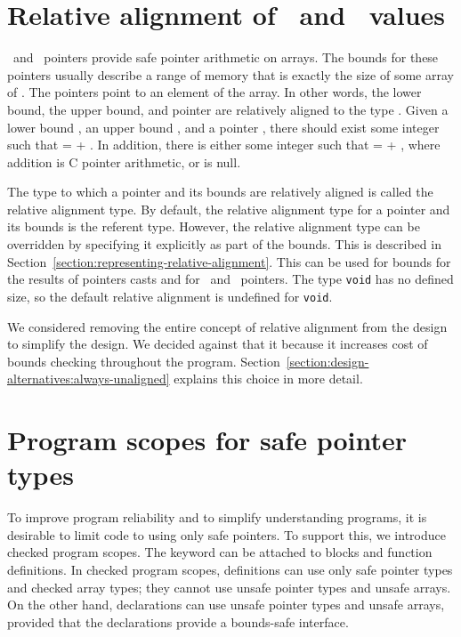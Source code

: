 \section{Relative alignment of \arrayptr\ and \arrayview\ values}
\label{section:relative-alignment}

\arrayptrT\ and \arrayviewT\ pointers provide safe
pointer arithmetic on arrays. The bounds for these pointers usually
describe a range of memory that is exactly the size of some array of .
The pointers point to an element of the array. In other words, the lower
bound, the upper bound, and pointer are  relatively aligned to the type
. Given a lower bound , an upper bound , and a
pointer , there should exist some integer  such that
 =  + . In addition, there is either some
integer  such that  =  + ,
where addition is C pointer arithmetic, or  is null.

The type to which a pointer and its bounds are relatively aligned is
called the relative alignment type. By default, the relative alignment
type for a pointer and its bounds is the referent type. However, the
relative alignment type can be overridden by specifying it explicitly as
part of the bounds.  This is described in 
Section~\ref{section:representing-relative-alignment}.
This can be used for bounds for the results of pointers casts and 
for  \arrayptrvoid\ and \arrayviewvoid\ pointers. The type
\texttt{void} has no defined size, so the default relative alignment is
undefined for \texttt{void}.

We considered removing the entire concept of relative alignment from the
design to simplify the design.  We decided against that it because it 
increases cost of bounds checking throughout the program.  
Section~\ref{section:design-alternatives:always-unaligned} explains
this choice in more detail.

\section{Program scopes for safe pointer types}

To improve program reliability and to simplify understanding programs,
it is desirable to limit code to using only safe pointers. To support
this, we introduce checked program scopes. The  keyword
can be attached to blocks and function definitions. In checked program
scopes, definitions can use only safe pointer types and checked array
types; they cannot use unsafe pointer types and unsafe arrays. On the
other hand, declarations can use unsafe pointer types and unsafe arrays,
provided that the declarations provide a bounds-safe interface.

